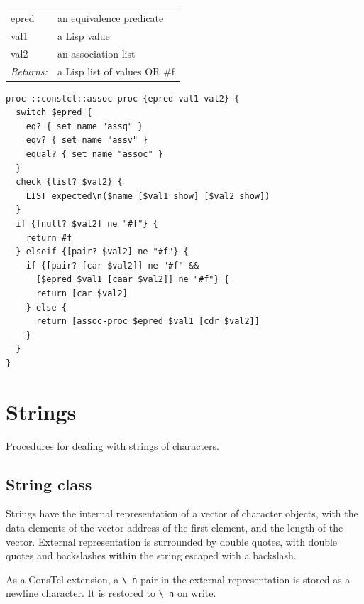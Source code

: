 \documentclass[twoside,9pt]{report}
\begin{document}
\noindent\begin{tabular}{ |p{1.5cm} p{8cm}| }
\hline
\rowcolor[HTML]{CCCCCC} \multicolumn{2}{|l|}{\bf assoc-proc (internal)} \\
epred & an equivalence predicate \\
val1 & a Lisp value \\
val2 & an association list \\
\textit{Returns:} & a Lisp list of values OR \#f \\
\hline
\end{tabular}
\begin{lstlisting}
proc ::constcl::assoc-proc {epred val1 val2} {
  switch $epred {
    eq? { set name "assq" }
    eqv? { set name "assv" }
    equal? { set name "assoc" }
  }
  check {list? $val2} {
    LIST expected\n($name [$val1 show] [$val2 show])
  }
  if {[null? $val2] ne "#f"} {
    return #f
  } elseif {[pair? $val2] ne "#f"} {
    if {[pair? [car $val2]] ne "#f" && 
      [$epred $val1 [caar $val2]] ne "#f"} {
      return [car $val2]
    } else {
      return [assoc-proc $epred $val1 [cdr $val2]]
    }
  }
}
\end{lstlisting}
\section{Strings}
\label{strings}


Procedures for dealing with strings of characters.

\subsection{String class}
\label{string-class}


Strings have the internal representation of a vector of character objects, with the data elements of the vector address of the first element, and the length of the vector. External representation is surrounded by double quotes, with double quotes and backslashes within the string escaped with a backslash.


As a ConsTcl extension, a \texttt{\textbackslash\ n} pair in the external representation is stored as a newline character. It is restored to \texttt{\textbackslash\ n} on write.
\end{document}
